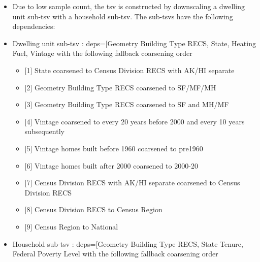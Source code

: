 \begin{itemize}
 
\item
  Due to low sample count, the tsv is constructed by downscaling a
  dwelling unit sub-tsv with a household sub-tsv. The sub-tsvs have the
  following dependencies:
\item
  Dwelling unit sub-tsv : deps={[}\textquotesingle Geometry Building
  Type RECS\textquotesingle, \textquotesingle State\textquotesingle,
  \textquotesingle Heating Fuel\textquotesingle,
  \textquotesingle Vintage\textquotesingle{]} with the following
  fallback coarsening order

  \begin{itemize}
   
  \item
    {[}1{]} State coarsened to Census Division RECS with AK/HI separate
  \item
    {[}2{]} Geometry Building Type RECS coarsened to SF/MF/MH
  \item
    {[}3{]} Geometry Building Type RECS coarsened to SF and MH/MF
  \item
    {[}4{]} Vintage coarsened to every 20 years before 2000 and every 10
    years subsequently
  \item
    {[}5{]} Vintage homes built before 1960 coarsened to pre1960
  \item
    {[}6{]} Vintage homes built after 2000 coarsened to 2000-20
  \item
    {[}7{]} Census Division RECS with AK/HI separate coarsened to Census
    Division RECS
  \item
    {[}8{]} Census Division RECS to Census Region
  \item
    {[}9{]} Census Region to National
  \end{itemize}
\item
  Household sub-tsv : deps={[}\textquotesingle Geometry Building Type
  RECS\textquotesingle, \textquotesingle State\textquotesingle{}
  \textquotesingle Tenure\textquotesingle, \textquotesingle Federal
  Poverty Level\textquotesingle{]} with the following fallback
  coarsening order

  \begin{itemize}
   

\end{itemize}
\end{itemize}

